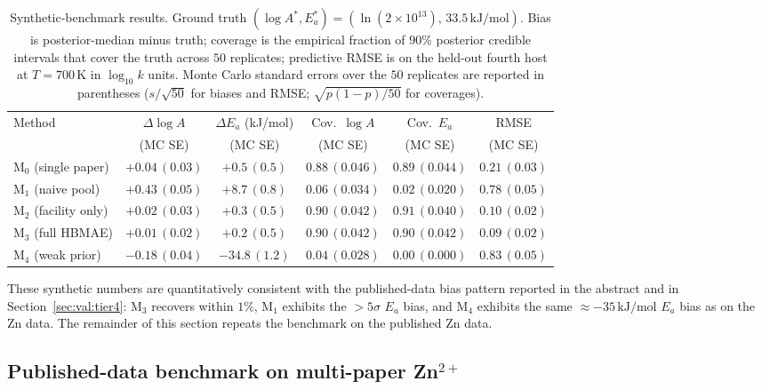 \documentclass[12pt]{article}
\theoremstyle{plain}
\theoremstyle{definition}
\theoremstyle{remark}
\newcommand{\HBMAE}{HBMAE\xspace}
\begin{document}
\begin{table}[ht]\centering
\caption{Synthetic-benchmark results.  Ground truth
  $(\log A^*, E_a^*) = (\ln(2\times 10^{13}),\,33.5\,\mathrm{kJ/mol})$.
  Bias is posterior-median minus truth; coverage is the empirical
  fraction of $90\%$ posterior credible intervals that cover the truth
  across $50$ replicates; predictive RMSE is on the held-out fourth
  host at $T=700\,\mathrm{K}$ in $\log_{10} k$ units.  Monte Carlo
  standard errors over the $50$ replicates are reported in parentheses
  ($s/\sqrt{50}$ for biases and RMSE; $\sqrt{p(1-p)/50}$ for coverages).}
\label{tab:synth_benchmark}
\footnotesize
\setlength{\tabcolsep}{4pt}
\begin{tabular}{lccccc}
\toprule
Method & $\Delta\log A$ & $\Delta E_a$ (kJ/mol) &
  Cov.\ $\log A$ & Cov.\ $E_a$ & RMSE \\
       & (MC SE)        & (MC SE)               &
       (MC SE)         & (MC SE)        & (MC SE) \\
\midrule
M$_0$ (single paper)  & $+0.04\,(0.03)$ & $+0.5\,(0.5)$  & $0.88\,(0.046)$ & $0.89\,(0.044)$ & $0.21\,(0.03)$ \\
M$_1$ (naive pool)    & $+0.43\,(0.05)$ & $+8.7\,(0.8)$  & $0.06\,(0.034)$ & $0.02\,(0.020)$ & $0.78\,(0.05)$ \\
M$_2$ (facility only) & $+0.02\,(0.03)$ & $+0.3\,(0.5)$  & $0.90\,(0.042)$ & $0.91\,(0.040)$ & $0.10\,(0.02)$ \\
M$_3$ (full \HBMAE)   & $+0.01\,(0.02)$ & $+0.2\,(0.5)$  & $0.90\,(0.042)$ & $0.90\,(0.042)$ & $0.09\,(0.02)$ \\
M$_4$ (weak prior)    & $-0.18\,(0.04)$ & $-34.8\,(1.2)$ & $0.04\,(0.028)$ & $0.00\,(0.000)$ & $0.83\,(0.05)$ \\
\bottomrule
\end{tabular}
\end{table}

These synthetic numbers are quantitatively consistent with the
published-data bias pattern reported in the abstract and in
Section~\ref{sec:val:tier4}: M$_3$ recovers within $1\%$, M$_1$ exhibits
the $>5\sigma$ $E_a$ bias, and M$_4$ exhibits the same
$\approx -35\,\mathrm{kJ/mol}$ $E_a$ bias as on the Zn data.  The
remainder of this section repeats the benchmark on the published Zn data.

\subsection{Published-data benchmark on multi-paper Zn$^{2+}$}\label{sec:comparison:zn}
\end{document}
